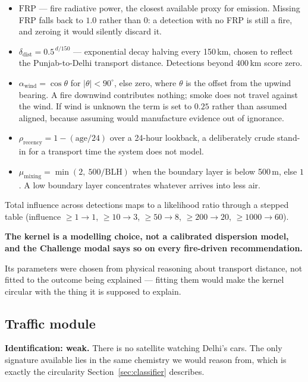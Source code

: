 \documentclass[11pt,a4paper]{article}
\newcommand{\keyclaim}[1]{%
  \par\vspace{0.7ex}\noindent
  \colorbox{vwash}{\parbox{\dimexpr\linewidth-2\fboxsep}{%
    \color{vblack}\textbf{#1}}}%
  \par\vspace{0.9ex}}
\begin{document}
\begin{itemize}
  \item $\mathrm{FRP}$ --- fire radiative power, the closest available proxy for
  emission. Missing FRP falls back to $1.0$ rather than $0$: a detection with no FRP
  is still a fire, and zeroing it would silently discard it.
  \item $\delta_{\text{dist}} = 0.5^{\,d/150}$ --- exponential decay halving every
  150\,km, chosen to reflect the Punjab-to-Delhi transport distance. Detections
  beyond 400\,km score zero.
  \item $\alpha_{\text{wind}} = \cos\theta$ for $|\theta| < 90^{\circ}$, else zero,
  where $\theta$ is the offset from the upwind bearing. A fire downwind contributes
  nothing; smoke does not travel against the wind. If wind is unknown the term is
  set to $0.25$ rather than assumed aligned, because assuming would manufacture
  evidence out of ignorance.
  \item $\rho_{\text{recency}} = 1 - (\text{age}/24)$ over a 24-hour lookback,
  a deliberately crude stand-in for a transport time the system does not model.
  \item $\mu_{\text{mixing}} = \min(2,\ 500/\mathrm{BLH})$ when the boundary layer
  is below 500\,m, else $1$. A low boundary layer concentrates whatever arrives into
  less air.
\end{itemize}

Total influence across detections maps to a likelihood ratio through a stepped
table (influence $\geq 1 \to 1$, $\geq 10 \to 3$, $\geq 50 \to 8$, $\geq 200 \to
20$, $\geq 1000 \to 60$).

\keyclaim{The kernel is a modelling choice, not a calibrated dispersion model, and
the Challenge modal says so on every fire-driven recommendation.}

Its parameters were chosen from physical reasoning about transport distance, not
fitted to the outcome being explained --- fitting them would make the kernel
circular with the thing it is supposed to explain.

\subsection{Traffic module}

\textbf{Identification: weak.} There is no satellite watching Delhi's cars. The only
signature available lies in the same chemistry we would reason from, which is
exactly the circularity Section~\ref{sec:classifier} describes.
\end{document}
